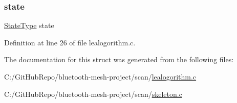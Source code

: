 \subsubsection{\texorpdfstring{state}{state}}
{\footnotesize\ttfamily \mbox{\hyperlink{scan_2lealogorithm_8c_a1615968a92950438f6e67a28e9d56e5c}{State\+Type}} state}



Definition at line 26 of file lealogorithm.\+c.



The documentation for this struct was generated from the following files\+:\begin{DoxyCompactItemize}
\item 
C\+:/\+Git\+Hub\+Repo/bluetooth-\/mesh-\/project/scan/\mbox{\hyperlink{scan_2lealogorithm_8c}{lealogorithm.\+c}}\item 
C\+:/\+Git\+Hub\+Repo/bluetooth-\/mesh-\/project/scan/\mbox{\hyperlink{scan_2skeleton_8c}{skeleton.\+c}}\end{DoxyCompactItemize}
